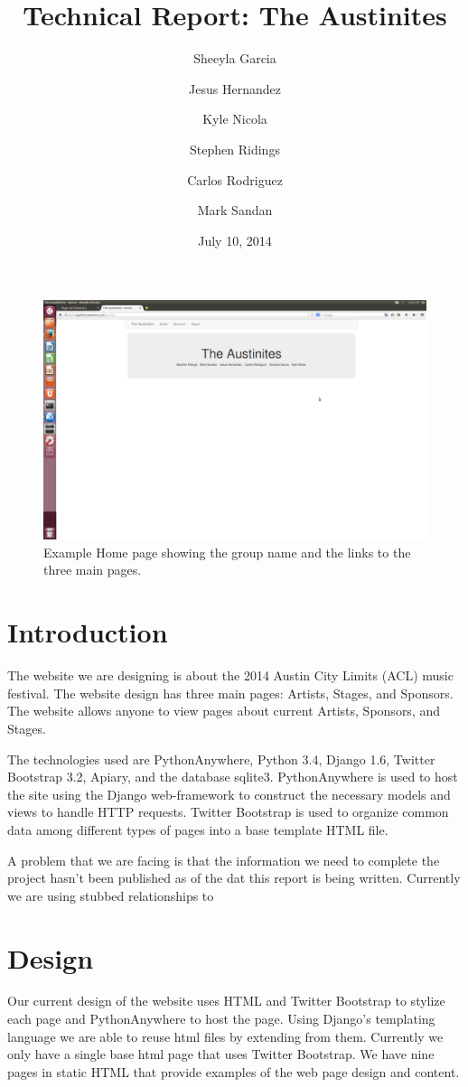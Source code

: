 \documentclass[12pt,english]{scrartcl}
\title{Technical Report: The Austinites}
\author{
  Sheeyla Garcia\\
  \and
  Jesus Hernandez\\
  \and
  Kyle Nicola\\
  \and
  Stephen Ridings\\
  \and
  Carlos Rodriguez\\
  \and
  Mark Sandan\\  
}
\date{ July 10, 2014 }
\begin{document}
\thispagestyle{plain}
\maketitle
\tableofcontents

\begin{figure}[h!]
\includegraphics[width=\textwidth]{home}
 \caption{Example Home page showing the group name and the links to the three main pages.}
\end{figure}

\section{Introduction}
The website we are designing is about the 2014 Austin City Limits (ACL) music festival. The website design has three main pages: Artists, Stages, and Sponsors.
The website allows anyone to view pages about current Artists, Sponsors, and Stages.

The technologies used are PythonAnywhere, Python 3.4, Django 1.6,
Twitter Bootstrap 3.2, Apiary, and the database sqlite3. PythonAnywhere is used to host the site using the Django web-framework to 
construct the necessary models and views to handle HTTP requests. Twitter Bootstrap is used to organize common data among different
types of pages into a base template HTML file. 

A problem that we are facing is that the information we need to complete the project hasn't been published as of the dat this report
is being written. Currently we are using stubbed relationships to 

\section{Design}
Our current design of the website uses HTML and Twitter Bootstrap to stylize each page and PythonAnywhere to host the page. 
Using Django's templating language we are able to reuse html files by extending from them. Currently we only have a single base html page that
uses Twitter Bootstrap. We have nine pages in static HTML that provide examples of the web page design and content.
\end{document}
